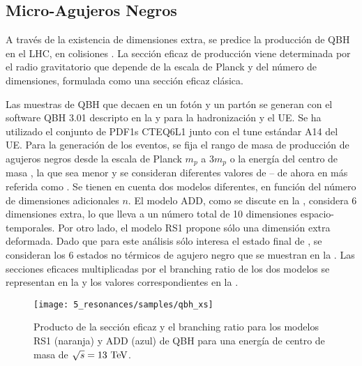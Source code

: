 \subsection{Micro-Agujeros Negros}
\label{subsec:samples:samples:sig:qbh}


A través de la existencia de dimensiones extra, se predice la producción de \acf{QBH} en el \ac{LHC}, en colisiones \pp.
La sección eficaz de producción viene determinada por el radio gravitatorio que depende de la escala de Planck y del número de dimensiones, formulada como una sección eficaz clásica.


Las muestras de \ac{QBH} que decaen en un fotón y un partón se generan con el software \ac{QBH} 3.01 descripto en la  y  para la hadronización y el \ac{UE}. Se ha utilizado el conjunto de \acp{PDF1} CTEQ6L1 junto con el tune estándar A14 del \ac{UE}. Para la generación de los eventos, se fija el rango de masa de producción de agujeros negros desde la escala de Planck \(m_p\) a \(3 m_p\) o la energía del centro de masa \sqs, la que sea menor y se consideran diferentes valores de \mth -- de ahora en más referida como \mqbh. Se tienen en cuenta dos modelos diferentes, en función del número de dimensiones adicionales \(n\). El modelo ADD, como se discute en la \Sect{\ref{subsec:theory:bsm:qbh}}, considera 6 dimensiones extra, lo que lleva a un número total de 10 dimensiones espacio-temporales. Por otro lado, el modelo RS1 propone sólo una dimensión extra deformada. Dado que para este análisis sólo interesa el estado final de \gammajet, se consideran los 6 estados no térmicos de agujero negro que se muestran en la \Sect{\ref{subsec:theory:bsm:qbh}}. Las secciones eficaces multiplicadas por el branching ratio de los dos modelos se representan en la \Fig{\ref{fig:samples:samples:sig:qbh:xs}} y los valores correspondientes en la \Tab{\ref{tab:samples:samples:sig:qbh:xs}}.


\begin{figure}[ht!]
    \centering
    \texttt{[image: 5\_resonances/samples/qbh\_xs]}
    \caption{Producto de la sección eficaz y el branching ratio para los modelos RS1 (naranja) y ADD (azul) de \ac{QBH} para una energía de centro de masa de \(\sqrt{s}=13~\text{TeV}\).}
    \label{fig:samples:samples:sig:qbh:xs}
\end{figure}


